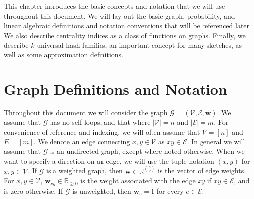 \documentclass[10]{article}
\begin{document}
This chapter introduces the basic concepts and notation that we will use throughout this document.
We will lay out the basic graph, probability, and linear algebraic definitions and notation conventions that will be referenced later
We also describe centrality indices as a class of functions on graphs.
Finally, we describe $k$-universal hash families, an important concept for many sketches, as well as some approximation definitions.



\section{Graph Definitions and Notation} \label{background:sec:graphdef}

Throughout this document we will consider the graph $\mathcal{G} = (\mathcal{V}, \mathcal{E}, \mathbf{w})$.
We assume that $\mathcal{G}$ has no self loops, and that where $|\mathcal{V}| = n$ and $|\mathcal{E}| = m$.
For convenience of reference and indexing, we will often assume that $\mathcal{V} = [n]$ and $E = [m]$. 
We denote an edge connecting $x, y \in \mathcal{V}$ as $xy \in \mathcal{E}$. 
In general we will assume that $\mathcal{G}$ is an  undirected graph, except where noted otherwise. 
When we want to specify a direction on an edge, we will use the tuple notation $(x, y)$ for $x, y \in \mathcal{V}$.
If $\mathcal{G}$ is a weighted graph, then $\mathbf{w} \in \mathbb{R}^{{n \choose 2}}$ is the vector of edge weights. 
For $x, y \in \mathcal{V}$, $\mathbf{w}_{xy} \in \mathbb{R}_{\geq 0}$ is the weight associated with the edge $xy$ if $xy \in \mathcal{E}$, and is zero otherwise.
If $\mathcal{G}$ is unweighted, then $\mathbf{w}_e = 1$ for every $e \in \mathcal{E}$. 
\end{document}
